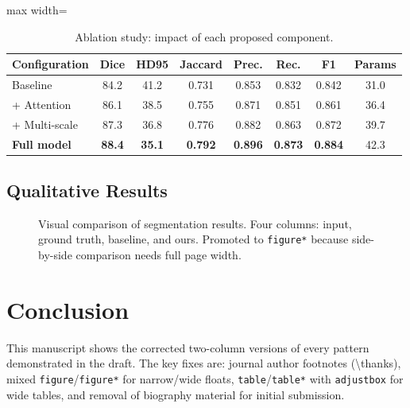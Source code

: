 \documentclass[journal,twocolumn]{IEEEtran}   %
\begin{document}
\begin{table}[t!]
\centering
\caption{Ablation study: impact of each proposed component.}
\label{tab:ablation}
\begin{adjustbox}{max width=\textwidth}
\begin{tabular}{lccccccc}
\toprule
Configuration       & Dice & HD95  & Jaccard & Prec. & Rec.  & F1    & Params \\
\midrule
Baseline            & 84.2 & 41.2  & 0.731   & 0.853 & 0.832 & 0.842 & 31.0   \\
+ Attention         & 86.1 & 38.5  & 0.755   & 0.871 & 0.851 & 0.861 & 36.4   \\
+ Multi-scale       & 87.3 & 36.8  & 0.776   & 0.882 & 0.863 & 0.872 & 39.7   \\
\textbf{Full model} & \textbf{88.4} & \textbf{35.1} & \textbf{0.792}
                    & \textbf{0.896} & \textbf{0.873} & \textbf{0.884} & 42.3 \\
\bottomrule
\end{tabular}
\end{adjustbox}
\end{table}

\subsection{Qualitative Results}
\lipsum[8]

\begin{figure}[t!]
\centering
\fbox{\rule{0pt}{1.5in}\rule{0.92\textwidth}{0pt}}
\caption{Visual comparison of segmentation results.
         Four columns: input, ground truth, baseline, and ours.
         Promoted to \texttt{figure*} because side-by-side comparison
         needs full page width.}
\label{fig:qualitative}
\end{figure}

\section{Conclusion}
This manuscript shows the corrected two-column versions of every pattern
demonstrated in the draft.  The key fixes are: journal author footnotes
(\textbackslash thanks), mixed \texttt{figure}/\texttt{figure*} for
narrow/wide floats, \texttt{table}/\texttt{table*} with
\texttt{adjustbox} for wide tables, and removal of biography material
for initial submission.
\lipsum[9]
\end{document}
